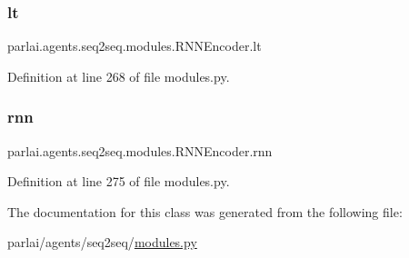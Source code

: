 \subsubsection{\texorpdfstring{lt}{lt}}
{\footnotesize\ttfamily parlai.\+agents.\+seq2seq.\+modules.\+R\+N\+N\+Encoder.\+lt}



Definition at line 268 of file modules.\+py.

\mbox{\label{classparlai_1_1agents_1_1seq2seq_1_1modules_1_1RNNEncoder_aa64c67b1bfefa68a3e775a83001d308e}} 
\subsubsection{\texorpdfstring{rnn}{rnn}}
{\footnotesize\ttfamily parlai.\+agents.\+seq2seq.\+modules.\+R\+N\+N\+Encoder.\+rnn}



Definition at line 275 of file modules.\+py.



The documentation for this class was generated from the following file\+:\begin{DoxyCompactItemize}
\item 
parlai/agents/seq2seq/\hyperlink{parlai_2agents_2seq2seq_2modules_8py}{modules.\+py}\end{DoxyCompactItemize}
